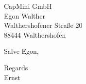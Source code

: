 \documentclass[a4paper,10pt,visualize,version=last]{scrlttr2}%
\begin{document}
\begin{letter}{%
  CapMini GmbH \\
  Egon Walther\\
  Walthershofener Straße 20\\
  88444 Walthershofen\\
} 
  \opening{Salve Egon,}
  
  \closing{Regards\\[2\baselineskip]\noindent Ernst}

\end{letter}
\end{document}
